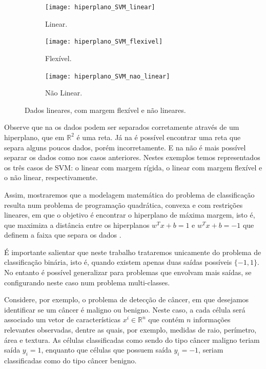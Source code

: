 \documentclass[12pt,a4paper]{scrartcl}
\def\RR{\mathds{R}}
\theoremstyle{definition}%
\begin{document}
\begin{figure}[!ht] 
\centering
\begin{subfigure}[h]{0.3\textwidth}
\centering
\texttt{[image: hiperplano\_SVM\_linear]}
\caption{Linear. \label{fig:classificacao_dados:hiperplano_SVM_linear}}
\end{subfigure}
\begin{subfigure}[!ht]{0.3\textwidth}
	\centering
	\texttt{[image: hiperplano\_SVM\_flexivel]}
	\caption{Flexível. \label{fig:classificacao_dados:hiperplano_SVM_flexivel}}
\end{subfigure}
\begin{subfigure}[!ht]{0.3\textwidth}
	\centering
	\texttt{[image: hiperplano\_SVM\_nao\_linear]}
	\caption{Não Linear. \label{fig:classificacao_dados:hiperplano_SVM_nao_linear}}
\end{subfigure}
\caption{Dados lineares, com margem flexível e não lineares. \label{fig:classificacao_dados}}
\end{figure}

Observe que na  os dados podem ser separados corretamente através de um hiperplano, que em $\RR^{2}$ é uma reta. Já na  é possível encontrar uma reta que separa alguns poucos dados, porém incorretamente. E na  não é mais possível separar os dados como nos casos anteriores. Nestes exemplos temos representados os três casos de SVM: o linear com margem rígida, o linear com margem flexível e o não linear, respectivamente.

Assim, mostraremos que a modelagem matemática do problema de classificação resulta num problema de programação quadrática, convexa e com restrições lineares, em que o objetivo é encontrar o hiperplano de máxima margem, isto é, que maximiza a distância entre os hiperplanos $w^{T}x+b = 1$ e $w^{T}x+b = -1$ que definem a faixa que separa os dados \cite{Evelin2017}. 

É importante salientar que neste trabalho trataremos unicamente do problema de classificação binária, isto é, quando existem apenas duas saídas possíveis $\{-1,1\}$. No entanto é possível generalizar para problemas que envolvam mais saídas, se configurando neste caso num problema multi-classes. 

Considere, por exemplo, o problema de detecção de câncer, em que desejamos identificar se um câncer é maligno ou benigno. Neste caso, a cada célula será associado um vetor de características $x^{i} \in \RR^{n}$ que contém $n$ informações relevantes observadas, dentre as quais, por exemplo, medidas de raio, perímetro, área e textura. As células classificadas como sendo do tipo câncer maligno teriam saída $y_{i} = 1$, enquanto que células que possuem saída $y_{i} = -1$, seriam classificadas como do tipo câncer benigno. 
\end{document}
